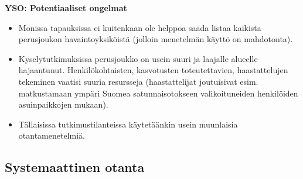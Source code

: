 \documentclass[
]{book}
\providecommand{\tightlist}{%
  \setlength{\itemsep}{0pt}\setlength{\parskip}{0pt}}
\begin{document}
\textbf{YSO: Potentiaaliset ongelmat}

\begin{itemize}
\tightlist
\item
  Monissa tapauksissa ei kuitenkaan ole helppoa saada listaa kaikista perusjoukon havaintoyksiköistä (jolloin menetelmän käyttö on mahdotonta).
\item
  Kyselytutkimuksissa perusjoukko on usein suuri ja laajalle alueelle hajaantunut. Henkilökohtaisten, kasvotusten toteutettavien, haastattelujen tekeminen vaatisi suuria resursseja (haastattelijat joutuisivat esim. matkustamaan ympäri Suomea satunnaisotokseen valikoituneiden henkilöiden asuinpaikkojen mukaan).
\item
  Tällaisissa tutkimustilanteissa käytetäänkin usein muunlaisia otantamenetelmiä.
\end{itemize}

\hypertarget{systemaattinen-otanta}{%
\subsection{Systemaattinen otanta}\label{systemaattinen-otanta}}
\end{document}

